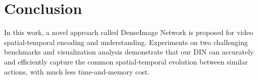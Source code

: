 \documentclass{article}
\begin{document}
\section{Conclusion}
In this work, a novel approach called DenseImage Network is proposed for video spatial-temporal encoding and understanding. Experiments on two challenging benchmarks and visualization analysis demonstrate that our DIN can accurately and efficiently capture the common spatial-temporal evolution between similar actions, with much less time-and-memory cost.




\end{document}

